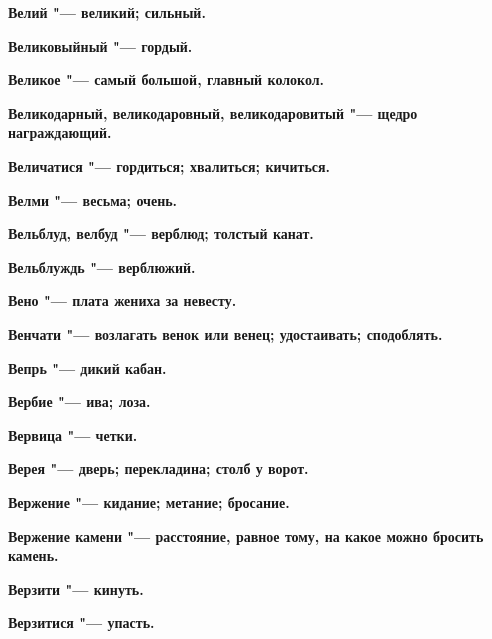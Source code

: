 \begin{mymulticols}{2}
\bfseries Велий\normalfont{} "--- великий; сильный. 




\bfseries Великовыйный\normalfont{} "--- гордый. 




\bfseries Великое\normalfont{} "--- самый большой, главный колокол. 




\bfseries Великодарный, великодаровный, великодаровитый\normalfont{} "--- щедро награждающий. 




\bfseries Величатися\normalfont{} "--- гордиться; хвалиться; кичиться. 




\bfseries Велми\normalfont{} "--- весьма; очень. 




\bfseries Вельблуд, велбуд\normalfont{} "--- верблюд; толстый канат. 




\bfseries Вельблуждь\normalfont{} "--- верблюжий. 




\bfseries Вено\normalfont{} "--- плата жениха за невесту. 




\bfseries Венчати\normalfont{} "--- возлагать венок или венец; удостаивать; сподоблять. 




\bfseries Вепрь\normalfont{} "--- дикий кабан. 




\bfseries Вербие\normalfont{} "--- ива; лоза. 




\bfseries Вервица\normalfont{} "--- четки. 




\bfseries Верея\normalfont{} "--- дверь; перекладина; столб у ворот. 




\bfseries Вержение\normalfont{} "--- кидание; метание; бросание. 




\bfseries Вержение камени\normalfont{} "--- расстояние, равное тому, на какое можно бросить камень. 




\bfseries Верзити\normalfont{} "--- кинуть. 




\bfseries Верзитися\normalfont{} "--- упасть. 





\end{mymulticols}
